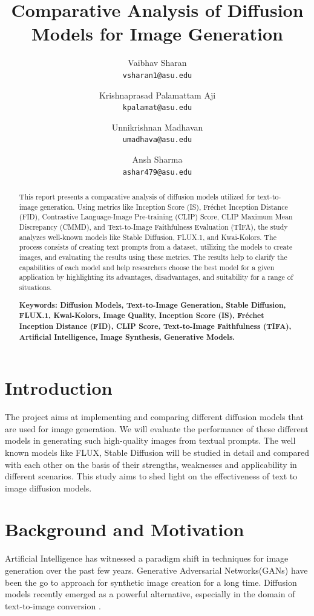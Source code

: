 \documentclass{article}
\title{Comparative Analysis of Diffusion Models for Image Generation
}
\author{
  Vaibhav Sharan\\
  \texttt{vsharan1@asu.edu} \\ 
  \and
  Krishnaprasad Palamattam Aji\\
  \texttt{kpalamat@asu.edu}\\
  \and
  Unnikrishnan Madhavan\\
  \texttt{umadhava@asu.edu}\\
  \and
  Ansh Sharma\\
  \texttt{ashar479@asu.edu}
}
\begin{document}
\maketitle

\begin{abstract}
    This report presents a comparative analysis of diffusion models utilized for text-to-image generation. Using metrics like Inception Score (IS), Fréchet Inception Distance (FID), Contrastive Language-Image Pre-training (CLIP) Score, CLIP Maximum Mean Discrepancy (CMMD), and Text-to-Image Faithfulness Evaluation (TIFA), the study analyzes well-known models like Stable Diffusion, FLUX.1, and Kwai-Kolors. The process consists of creating text prompts from a dataset, utilizing the models to create images, and evaluating the results using these metrics. The results help to clarify the capabilities of each model and help researchers choose the best model for a given application by highlighting its advantages, disadvantages, and suitability for a range of situations.
    
    \textbf{Keywords: Diffusion Models, Text-to-Image Generation, Stable Diffusion, FLUX.1, Kwai-Kolors, Image Quality, Inception Score (IS), Fréchet Inception Distance (FID), CLIP Score, Text-to-Image Faithfulness (TIFA), Artificial Intelligence, Image Synthesis, Generative Models.}
\end{abstract}

\section{Introduction}
The project aims at implementing and comparing different diffusion models that are used for 
image generation. We will evaluate the performance of these different models in generating
such high-quality images from textual prompts. The well known models like FLUX, Stable
Diffusion will be studied in detail and compared with each other on the basis of
their strengths, weaknesses and applicability in different scenarios. This study aims to shed light
on the effectiveness of text to image diffusion models.


\section{Background and Motivation}
Artificial Intelligence has witnessed a paradigm shift in techniques for image generation over the past few years. 
Generative Adversarial Networks(GANs) have been the go to approach for synthetic image creation for a long time. 
Diffusion models recently emerged as a powerful alternative, especially in the domain of text-to-image conversion \cite{dhariwal2021}. 
\end{document}
